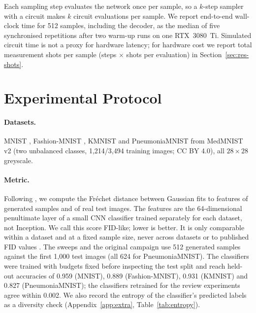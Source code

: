 \documentclass[11pt]{article}
\newcommand{\fidlike}{FID-like}
\begin{document}
Each sampling step evaluates the network once per sample, so a $k$-step
sampler with a circuit makes $k$ circuit evaluations per sample. We report
end-to-end wall-clock time for 512 samples, including the decoder, as the median
of five synchronised repetitions after two warm-up runs on one RTX~3080~Ti.
Simulated circuit time is not a proxy for hardware latency; for hardware cost
we report total measurement shots per sample (steps $\times$ shots per
evaluation) in Section~\ref{sec:res-shots}.

\section{Experimental Protocol}
\label{sec:protocol}

\paragraph{Datasets.} MNIST \citep{lecun1998mnist}, Fashion-MNIST
\citep{xiao2017fashion}, KMNIST \citep{clanuwat2018kmnist} and PneumoniaMNIST
from MedMNIST v2 \citep{yang2023medmnist} (two unbalanced classes,
1{,}214/3{,}494 training images; CC BY 4.0), all $28\times28$ greyscale.

\paragraph{Metric.} Following \citet{heusel2017fid}, we compute the Fréchet
distance between Gaussian fits to features of generated samples and of real
test images. The features are the 64-dimensional penultimate layer of a small CNN
classifier trained separately for each dataset, not Inception. We call this score
\fidlike{}; lower is better. It is only comparable within a dataset and at a fixed
sample size, never across datasets or to published FID values
\citep{chong2020effectively}. The sweeps and the original campaign use 512
generated samples against the first 1{,}000 test images (all 624 for
PneumoniaMNIST). The classifiers were trained with budgets fixed before inspecting
the test split and reach held-out accuracies of 0.959 (MNIST), 0.889
(Fashion-MNIST), 0.931 (KMNIST) and 0.827 (PneumoniaMNIST); the classifiers
retrained for the review experiments agree within 0.002. We also record the
entropy of the classifier's predicted labels as a diversity check
(Appendix~\ref{app:extra}, Table~\ref{tab:entropy}).
\end{document}
